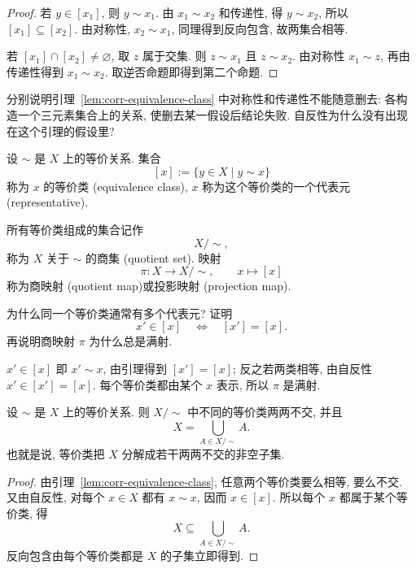 \documentclass[usesamecnt, thmcnt=section, lang=cn, newtx, 10pt, scheme=chinese]{elegantbook}
\begin{document}
\begin{proof}
若 $y\in[x_1]$, 则 $y\sim x_1$. 由 $x_1\sim x_2$ 和传递性, 得 $y\sim x_2$, 所以 $[x_1]\subseteq[x_2]$. 由对称性, $x_2\sim x_1$, 同理得到反向包含, 故两集合相等.

若 $[x_1]\cap[x_2]\neq\varnothing$, 取 $z$ 属于交集. 则 $z\sim x_1$ 且 $z\sim x_2$. 由对称性 $x_1\sim z$, 再由传递性得到 $x_1\sim x_2$. 取逆否命题即得到第二个命题.
\end{proof}

\begin{exercise}\label{ex:corr-equivalence-class-lemma}
分别说明引理~\ref{lem:corr-equivalence-class} 中对称性和传递性不能随意删去: 各构造一个三元素集合上的关系, 使删去某一假设后结论失败. 自反性为什么没有出现在这个引理的假设里?
\end{exercise}

\begin{definition}[等价类与商集]\label{def:corr-quotient}
设 $\sim$ 是 $X$ 上的等价关系. 集合
\[
 [x]:=\{y\in X\mid y\sim x\}
\]
称为 $x$ 的{\color{blue}等价类 (equivalence class)}, $x$ 称为这个等价类的一个{\color{blue}代表元 (representative)}.

所有等价类组成的集合记作
\[
 X/{\sim},
\]
称为 $X$ 关于 $\sim$ 的{\color{blue}商集 (quotient set)}. 映射
\[
 \pi:X\longrightarrow X/{\sim},
 \qquad
 x\longmapsto[x]
\]
称为{\color{blue}商映射 (quotient map)}或{\color{blue}投影映射 (projection map)}.
\end{definition}

\begin{concept}\label{con:corr-16}
为什么同一个等价类通常有多个代表元? 证明
\[
 x'\in[x]
 \quad\Leftrightarrow\quad
 [x']=[x].
\]
再说明商映射 $\pi$ 为什么总是满射.
\end{concept}

\begin{solution}
$x'\in[x]$ 即 $x'\sim x$, 由引理得到 $[x']=[x]$; 反之若两类相等, 由自反性 $x'\in[x']=[x]$. 每个等价类都由某个 $x$ 表示, 所以 $\pi$ 是满射.
\end{solution}

\begin{proposition}\label{prop:corr-equivalence-partition}
设 $\sim$ 是 $X$ 上的等价关系. 则 $X/{\sim}$ 中不同的等价类两两不交, 并且
\[
 X=\bigcup_{A\in X/{\sim}}A.
\]
也就是说, 等价类把 $X$ 分解成若干两两不交的非空子集.
\end{proposition}

\begin{proof}
由引理~\ref{lem:corr-equivalence-class}, 任意两个等价类要么相等, 要么不交. 又由自反性, 对每个 $x\in X$ 都有 $x\sim x$, 因而 $x\in[x]$. 所以每个 $x$ 都属于某个等价类, 得
\[
 X\subseteq\bigcup_{A\in X/{\sim}}A.
\]
反向包含由每个等价类都是 $X$ 的子集立即得到.
\end{proof}
\end{document}
